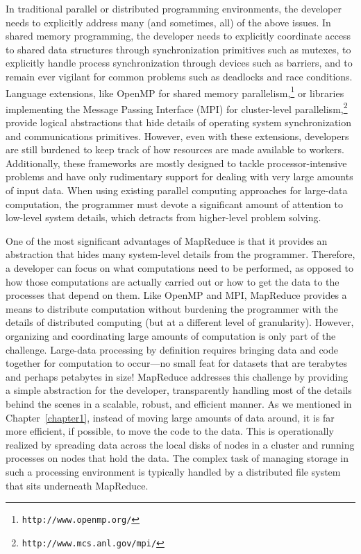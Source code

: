 In traditional parallel or distributed programming environments, the
developer needs to explicitly address many (and sometimes, all) of the
above issues.  In shared memory programming, the developer needs to
explicitly coordinate access to shared data structures through
synchronization primitives such as mutexes, to explicitly handle
process synchronization through devices such as barriers, and to
remain ever vigilant for common problems such as deadlocks and race
conditions.  Language extensions, like OpenMP for shared memory
parallelism,\footnote{\tt http://www.openmp.org/} or libraries
implementing the Message Passing Interface (MPI) for cluster-level
parallelism,\footnote{\tt http://www.mcs.anl.gov/mpi/} provide logical
abstractions that hide details of operating system synchronization and
communications primitives.  However, even with these extensions,
developers are still burdened to keep track of how resources are made
available to workers.  Additionally, these frameworks are mostly
designed to tackle processor-intensive problems and have only
rudimentary support for dealing with very large amounts of input data.
When using existing parallel computing approaches for large-data
computation, the programmer must devote a significant amount of
attention to low-level system details, which detracts from
higher-level problem solving.

One of the most significant advantages of MapReduce is that it
provides an abstraction that hides many system-level details from the
programmer.  Therefore, a developer can focus on what computations
need to be performed, as opposed to how those computations are
actually carried out or how to get the data to the processes that
depend on them.  Like OpenMP and MPI, MapReduce provides a means to
distribute computation without burdening the programmer with the
details of distributed computing (but at a different level of
granularity).  However, organizing and coordinating large amounts of
computation is only part of the challenge.  Large-data processing by
definition requires bringing data and code together for computation to
occur---no small feat for datasets that are terabytes and perhaps
petabytes in size!  MapReduce addresses this challenge by providing a
simple abstraction for the developer, transparently handling most of
the details behind the scenes in a scalable, robust, and efficient
manner.  As we mentioned in Chapter~\ref{chapter1}, instead of moving
large amounts of data around, it is far more efficient, if possible,
to move the code to the data.  This is operationally realized by
spreading data across the local disks of nodes in a cluster and
running processes on nodes that hold the data.  The complex task of
managing storage in such a processing environment is typically handled
by a distributed file system that sits underneath MapReduce.

